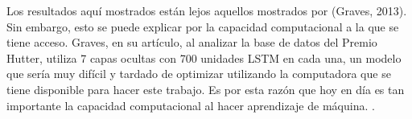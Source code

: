 \vspace{1em}

Los resultados aquí mostrados están lejos aquellos mostrados por (Graves, 2013). Sin embargo, esto se puede explicar por la capacidad computacional a la que se tiene acceso. Graves, en su artículo, al analizar la base de datos del Premio Hutter, utiliza 7 capas ocultas con 700 unidades LSTM en cada una, un modelo que sería muy difícil y tardado de optimizar utilizando la computadora que se tiene disponible para hacer este trabajo. Es por esta razón que hoy en día es tan importante la capacidad computacional al hacer aprendizaje de máquina. \cite{DBLP:journals/corr/Graves13}.